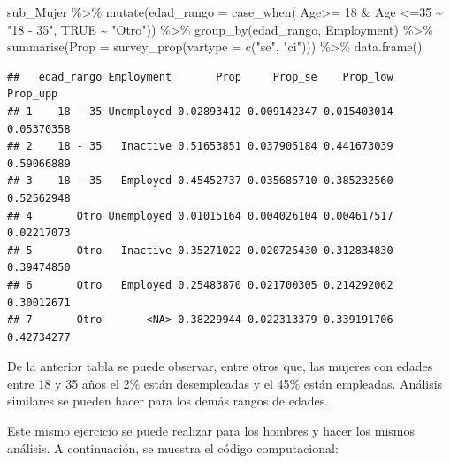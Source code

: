 \documentclass[
  12pt,
]{book}
\newenvironment{Shaded}{\begin{snugshade}}{\end{snugshade}}
\newcommand{\AttributeTok}[1]{\textcolor[rgb]{0.77,0.63,0.00}{#1}}
\newcommand{\ConstantTok}[1]{\textcolor[rgb]{0.00,0.00,0.00}{#1}}
\newcommand{\DecValTok}[1]{\textcolor[rgb]{0.00,0.00,0.81}{#1}}
\newcommand{\FunctionTok}[1]{\textcolor[rgb]{0.00,0.00,0.00}{#1}}
\newcommand{\NormalTok}[1]{#1}
\newcommand{\SpecialCharTok}[1]{\textcolor[rgb]{0.00,0.00,0.00}{#1}}
\newcommand{\StringTok}[1]{\textcolor[rgb]{0.31,0.60,0.02}{#1}}
\begin{document}
\begin{Shaded}
\begin{Highlighting}[]
\NormalTok{sub\_Mujer }\SpecialCharTok{\%\textgreater{}\%} \FunctionTok{mutate}\NormalTok{(}\AttributeTok{edad\_rango =} \FunctionTok{case\_when}\NormalTok{(}
\NormalTok{                     Age}\SpecialCharTok{\textgreater{}=} \DecValTok{18} \SpecialCharTok{\&}\NormalTok{ Age }\SpecialCharTok{\textless{}=}\DecValTok{35}  \SpecialCharTok{\textasciitilde{}} \StringTok{"18 {-} 35"}\NormalTok{, }\ConstantTok{TRUE} \SpecialCharTok{\textasciitilde{}} \StringTok{"Otro"}\NormalTok{)) }\SpecialCharTok{\%\textgreater{}\%}
                     \FunctionTok{group\_by}\NormalTok{(edad\_rango, Employment) }\SpecialCharTok{\%\textgreater{}\%} 
                     \FunctionTok{summarise}\NormalTok{(}\AttributeTok{Prop =} \FunctionTok{survey\_prop}\NormalTok{(}\AttributeTok{vartype =}  \FunctionTok{c}\NormalTok{(}\StringTok{"se"}\NormalTok{, }\StringTok{"ci"}\NormalTok{))) }\SpecialCharTok{\%\textgreater{}\%} 
                     \FunctionTok{data.frame}\NormalTok{()}
\end{Highlighting}
\end{Shaded}

\begin{verbatim}
##   edad_rango Employment       Prop     Prop_se    Prop_low   Prop_upp
## 1    18 - 35 Unemployed 0.02893412 0.009142347 0.015403014 0.05370358
## 2    18 - 35   Inactive 0.51653851 0.037905184 0.441673039 0.59066889
## 3    18 - 35   Employed 0.45452737 0.035685710 0.385232560 0.52562948
## 4       Otro Unemployed 0.01015164 0.004026104 0.004617517 0.02217073
## 5       Otro   Inactive 0.35271022 0.020725430 0.312834830 0.39474850
## 6       Otro   Employed 0.25483870 0.021700305 0.214292062 0.30012671
## 7       Otro       <NA> 0.38229944 0.022313379 0.339191706 0.42734277
\end{verbatim}

De la anterior tabla se puede observar, entre otros que, las mujeres con edades entre 18 y 35 años el 2\% están desempleadas y el 45\% están empleadas. Análisis similares se pueden hacer para los demás rangos de edades.

Este mismo ejercicio se puede realizar para los hombres y hacer los mismos análisis. A continuación, se muestra el código computacional:
\end{document}
